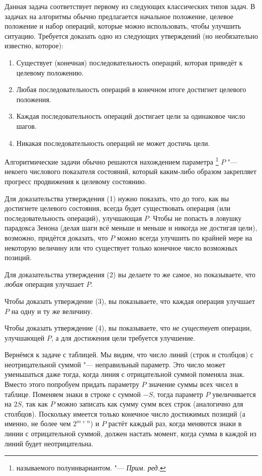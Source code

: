 \documentclass[twoside]{book}
\begin{document}
Данная задача соответствует первому из следующих классических типов задач.
В задачах на алгоритмы обычно предлагается начальное положение, целевое положение и набор операций, которые можно использовать, чтобы улучшить ситуацию.
Требуется доказать одно из следующих утверждений (но необязательно известно, которое):
\begin{enumerate}[label=(\arabic*),noitemsep,leftmargin=\parindent,labelsep=3.5pt]
\item Существует (конечная) последовательность операций, которая приведёт к целевому положению.
\item Любая последовательность операций в конечном итоге достигнет целевого положения.
\item Каждая последовательность операций достигает цели за одинаковое число шагов.
\item Никакая последовательность операций не может достичь цели.
\end{enumerate}

Алгоритмические задачи обычно решаются нахождением параметра%
\footnote{называемого полуинвариантом. "--- \emph{Прим. ред.}}
$P$ "--- некоего числового показателя состояний, который каким-либо образом закрепляет прогресс продвижения к целевому состоянию.

Для доказательства утверждения (1) нужно показать, что до того, как вы достигнете целевого состояния, всегда будет существовать операция (или последовательность операций), улучшающая $P$.
Чтобы не попасть в ловушку парадокса Зенона (делая шаги всё меньше и меньше и никогда не достигая цели), возможно, придётся доказать, что $P$ можно всегда улучшить по крайней мере на некоторую величину или что существует только конечное число возможных позиций.

Для доказательства утверждения (2) вы делаете то же самое, но показываете, что \emph{любая} операция улучшает $P$.

Чтобы доказать утверждение (3), вы показываете, что каждая операция улучшает $P$ на одну и ту же величину.

Чтобы доказать утверждение (4), вы показываете, что \emph{не существует} операции, улучшающей $P$, а для достижения цели требуется улучшение.

\medskip

Вернёмся к задаче с таблицей.
Мы видим, что число линий (строк и столбцов) с неотрицательной суммой "--- неправильный параметр.
Это число может уменьшаться даже тогда, когда линия с отрицательной суммой поменяла знак.
Вместо этого попробуем придать параметру $P$ значение суммы всех чисел в таблице.
Поменяем знаки в строке с суммой $-S$, тогда параметр $P$ увеличивается на $2S$, так как $P$ можно записать как сумму сумм всех строк (аналогично для столбцов).
Поскольку имеется только конечное число достижимых позиций
(а именно, не более чем $2^{m+n}$) и $P$ растёт каждый раз, когда меняются знаки в линии с отрицательной суммой, должен настать момент, когда сумма в каждой из линий будет неотрицательна.
\end{document}
